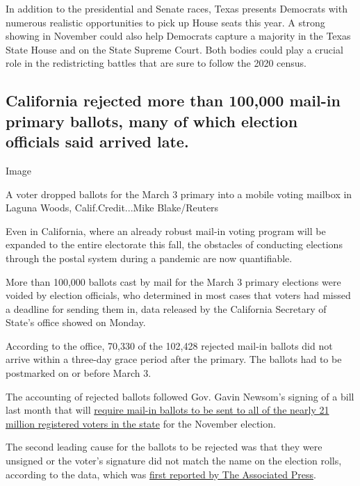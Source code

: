In addition to the presidential and Senate races, Texas presents
Democrats with numerous realistic opportunities to pick up House seats
this year. A strong showing in November could also help Democrats
capture a majority in the Texas State House and on the State Supreme
Court. Both bodies could play a crucial role in the redistricting
battles that are sure to follow the 2020 census.

\hypertarget{california-rejected-more-than-100000-mail-in-primary-ballots-many-of-which-election-officials-said-arrived-late}{%
\subsection{California rejected more than 100,000 mail-in primary
ballots, many of which election officials said arrived
late.}\label{california-rejected-more-than-100000-mail-in-primary-ballots-many-of-which-election-officials-said-arrived-late}}

Image

A voter dropped ballots for the March 3 primary into a mobile voting
mailbox in Laguna Woods, Calif.Credit...Mike Blake/Reuters

Even in California, where an already robust mail-in voting program will
be expanded to the entire electorate this fall, the obstacles of
conducting elections through the postal system during a pandemic are now
quantifiable.

More than 100,000 ballots cast by mail for the March 3 primary elections
were voided by election officials, who determined in most cases that
voters had missed a deadline for sending them in, data released by the
California Secretary of State's office showed on Monday.

According to the office, 70,330 of the 102,428 rejected mail-in ballots
did not arrive within a three-day grace period after the primary. The
ballots had to be postmarked on or before March 3.

The accounting of rejected ballots followed Gov. Gavin Newsom's signing
of a bill last month that will
\href{https://www.sacbee.com/news/politics-government/capitol-alert/article243636972.html}{require
mail-in ballots to be sent to all of the nearly 21 million registered
voters in the state} for the November election.

The second leading cause for the ballots to be rejected was that they
were unsigned or the voter's signature did not match the name on the
election rolls, according to the data, which was
\href{https://apnews.com/a45421048cd89938df7c882891a97db5}{first
reported by The Associated Press}.

